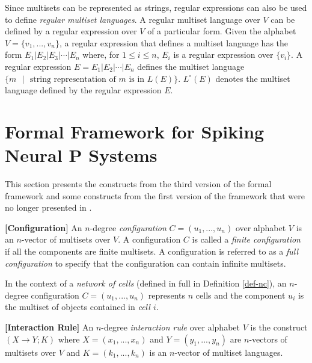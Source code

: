 \documentclass[a4paper]{article}
\theoremstyle{definition}
\newcommand{\ra}{\rightarrow}
\newcommand{\ts}{\text{ }}
\begin{document}
Since multisets can be represented as strings, regular expressions can also be used to define 
\emph{regular multiset languages}. A regular multiset language over $V$ can be defined by a regular
expression over $V$ of a particular form. Given the alphabet $V = \{v_1,...,v_n\}$, a regular 
expression that defines a multiset language has the form $E_1|E_2|E_3|\cdots|E_n$ where, for $1 \leq
i \leq n$, $E_i$ is a regular expression over $\{v_i\}$. A regular expression $E=E_1|E_2|\cdots|E_n$
defines the multiset language $\{m\ts|\ts \text{string representation of $m$ is in $L(E)$}\}$. 
$L^{\circ}(E)$ denotes the multiset language defined by the regular expression $E$.


\section{Formal Framework for Spiking Neural P Systems}\label{sec-ff}

This section presents the constructs from the third version of the formal framework 
\cite{verlan-2020-ff-3} and some constructs from the first version of the framework 
\cite{freund-2007-ff-1} that were no longer presented in \cite{verlan-2020-ff-3}.


\label{def-conf} \textbf{[Configuration]} An $n$-degree \emph{configuration} 
$C = (u_1,...,u_n)$ over alphabet $V$ is an $n$-vector of multisets over $V$. A configuration $C$ is 
called a \emph{finite configuration} if all the components are finite multisets. A configuration is 
referred to as a \emph{full configuration} to specify that the configuration can contain infinite 
multisets.

In the context of a \emph{network of cells} (defined in full in Definition \ref{def-nc}), an
$n$-degree configuration $C = (u_1,...,u_n)$ represents $n$ cells and the component $u_i$ is the
multiset of objects contained in \emph{cell $i$}.


\label{def-rule} \textbf{[Interaction Rule]} An $n$-degree \emph{interaction rule} over
alphabet $V$ is the construct $(X \ra Y; K)$ where $X=(x_1,...,x_n)$ and $Y=(y_1,...,y_n)$ 
are $n$-vectors of multisets over $V$ and $K = (k_1,...,k_n)$ is an $n$-vector of multiset
languages.
\end{document}
